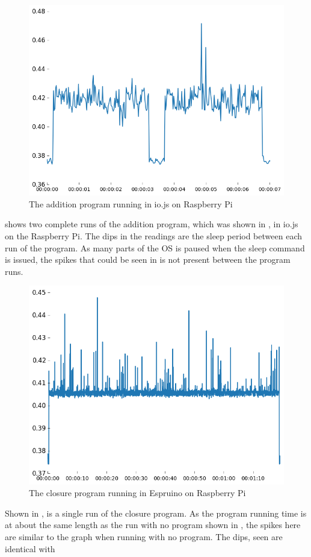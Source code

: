 \begin{figure}[h!]
\centering
\includegraphics[scale=0.6]{fig/graphs/addition_iojs.png}
\caption{The addition program running in io.js on Raspberry Pi}
\label{fig:addraspio}
\end{figure}
 shows two complete runs of the addition program, which was shown in , in io.js on the Raspberry Pi.
The dips in the readings are the sleep period between each run of the program.
As many parts of the OS is paused when the sleep command is issued, the spikes that could be seen in  is not present between the program runs.


\begin{figure}[ht]
\centering
\includegraphics[scale=0.6]{fig/graphs/closure_espruino.png}
\caption{The closure program running in Espruino on Raspberry Pi}
\label{fig:closesp}
\end{figure}
Shown in , is a single run of the closure program.
As the program running time is at about the same length as the run with no program shown in , the spikes here are similar to the graph when running with no program.
The dips, seen  are identical with 

